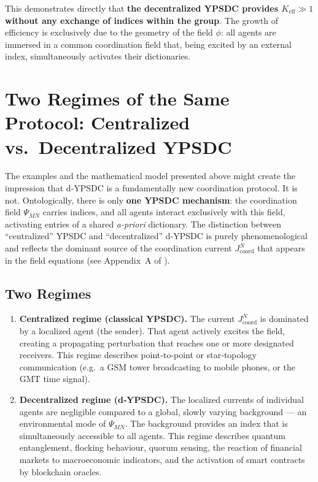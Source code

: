 \documentclass[12pt,a4paper]{article}
\begin{document}
	This demonstrates directly that \textbf{the decentralized YPSDC provides \(K_{\mathrm{eff}} \gg 1\) without any exchange of indices within the group}. The growth of efficiency is exclusively due to the geometry of the field \(\phi\): all agents are immersed in a common coordination field that, being excited by an external index, simultaneously activates their dictionaries.
	
	\section{Two Regimes of the Same Protocol: Centralized vs.\ Decentralized YPSDC}
	\label{sec:two-regimes}
	
	The examples and the mathematical model presented above might create the impression that
	d‑YPSDC is a fundamentally new coordination protocol. It is not. Ontologically, there is
	only \textbf{one YPSDC mechanism}: the coordination field $\Psi_{MN}$ carries indices, and
	all agents interact exclusively with this field, activating entries of a shared
	\emph{a‑priori} dictionary. The distinction between ``centralized'' YPSDC and
	``decentralized'' d‑YPSDC is purely phenomenological and reflects the dominant source
	of the coordination current $J^{N}_{\mathrm{coord}}$ that appears in the field equations
	(see Appendix~A of \cite{YUCT}).
	
	\subsection{Two Regimes}
	\begin{enumerate}[leftmargin=*, label=\textbf{(\arabic*)}]
		\item \textbf{Centralized regime (classical YPSDC).} The current $J^{N}_{\mathrm{coord}}$
		is dominated by a localized agent (the sender). That agent actively excites the field,
		creating a propagating perturbation that reaches one or more designated receivers.
		This regime describes point‑to‑point or star‑topology communication (e.g.\ a GSM
		tower broadcasting to mobile phones, or the GMT time signal).
		
		\item \textbf{Decentralized regime (d‑YPSDC).} The localized currents of individual
		agents are negligible compared to a global, slowly varying background --- an
		environmental mode of $\Psi_{MN}$. The background provides an index that is
		simultaneously accessible to all agents. This regime describes quantum entanglement,
		flocking behaviour, quorum sensing, the reaction of financial markets to macroeconomic
		indicators, and the activation of smart contracts by blockchain oracles.
	\end{enumerate}
	
\end{document}
